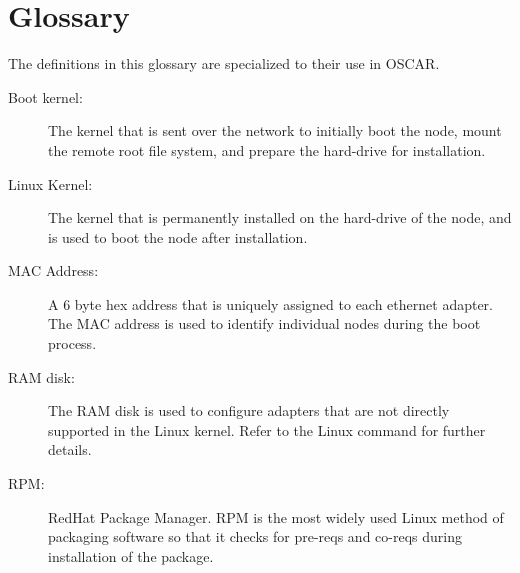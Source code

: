 \documentclass[letterpaper,11pt]{article}
\begin{document}
\section*{Glossary}
The definitions in this glossary are specialized to their use in
OSCAR.
\begin{description}
        \item[Boot kernel:] The kernel that is sent over the network to
        initially boot the node, mount the remote root file system, and
        prepare the hard-drive for installation.

        \item[Linux Kernel:] The kernel that is permanently installed on
        the hard-drive of the node, and is used to boot the node after
        installation.

        \item[MAC Address:] A 6 byte hex address that is uniquely assigned
        to each ethernet adapter.  The MAC address is used to identify
        individual nodes during the boot process.

        \item[RAM disk:] The RAM disk is used to configure adapters that
        are not directly supported in the Linux kernel.  Refer to the
        Linux  command for further details.

        \item[RPM:] RedHat Package Manager.  RPM is the most widely used
        Linux method of packaging software so that it checks for pre-reqs
        and co-reqs during installation of the package.
\end{description}
\end{document}
